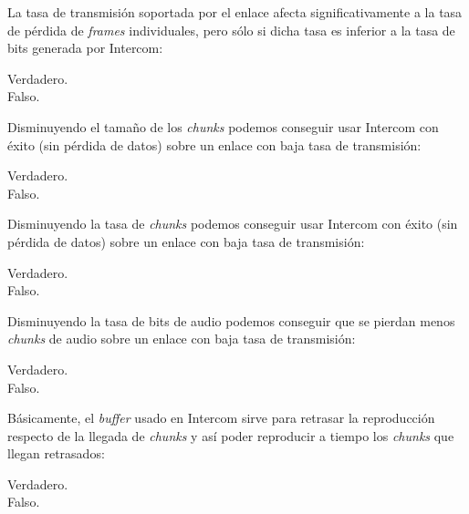 \documentclass[legalpaper, 12pt, addpoints]{exam}
\begin{document}
\begin{questions}
\vspace{0.10in}

\question La tasa de transmisión soportada por el enlace afecta
significativamente a la tasa de pérdida de \emph{frames} individuales,
pero sólo si dicha tasa es inferior a la tasa de bits generada por
Intercom:

\begin{oneparchoices}
  \choice Verdadero.\\
  \choice Falso.
\end{oneparchoices}
  
\vspace{0.10in}

\question Disminuyendo el tamaño de los \emph{chunks} podemos
conseguir usar Intercom con éxito (sin pérdida de datos) sobre un
enlace con baja tasa de transmisión:

\begin{oneparchoices}
  \choice Verdadero.\\
  \choice Falso.
\end{oneparchoices}
  
\vspace{0.10in}

\question Disminuyendo la tasa de \emph{chunks} podemos conseguir usar
Intercom con éxito (sin pérdida de datos) sobre un enlace con baja
tasa de transmisión:

\begin{oneparchoices}
  \choice Verdadero.\\
  \choice Falso.
\end{oneparchoices}
  
\vspace{0.10in}

\question Disminuyendo la tasa de bits de audio podemos conseguir que
se pierdan menos \emph{chunks} de audio sobre un enlace con baja tasa
de transmisión:

\begin{oneparchoices}
  \choice Verdadero.\\
  \choice Falso.
\end{oneparchoices}
  
\vspace{0.10in}

\question Básicamente, el \emph{buffer} usado en Intercom sirve para
retrasar la reproducción respecto de la llegada de \emph{chunks} y así
poder reproducir a tiempo los \emph{chunks} que llegan retrasados:

\begin{oneparchoices}
  \choice Verdadero.\\
  \choice Falso.
\end{oneparchoices}
  

\end{questions}
\end{document}
